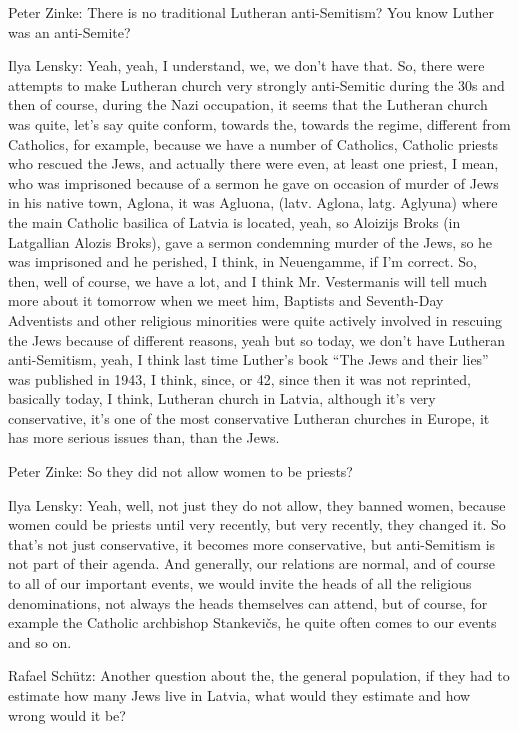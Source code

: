 Peter Zinke: There is no traditional Lutheran anti-Semitism? You know Luther was an anti-Semite? 

Ilya Lensky: Yeah, yeah, I understand, we, we don’t have that. So, there were attempts to make Lutheran church very strongly anti-Semitic during the 30s and then of course, during the Nazi occupation, it seems that the Lutheran church was quite, let’s say quite conform, towards the, towards the regime, different from Catholics, for example, because we have a number of Catholics, Catholic priests who rescued the Jews, and actually there were even, at least one priest, I mean, who was imprisoned because of a sermon he gave on occasion of murder of Jews in his native town, Aglona, it was Agluona, (latv. Aglona, latg. Aglyuna) where the main Catholic basilica of Latvia is located, yeah, so Aloizijs Broks (in Latgallian Alozis Broks), gave a sermon condemning murder of the Jews, so he was imprisoned and he perished, I think, in Neuengamme, if I’m correct. So, then, well of course, we have a lot, and I think Mr. Vestermanis will tell much more about it tomorrow when we meet him, Baptists and Seventh-Day Adventists and other religious minorities were quite actively involved in rescuing the Jews because of different reasons, yeah but so today, we don’t have Lutheran anti-Semitism, yeah, I think last time Luther’s book “The Jews and their lies” was published in 1943, I think, since, or 42, since then it was not reprinted, basically today, I think, Lutheran church in Latvia, although it’s very conservative, it’s one of the most conservative Lutheran churches in Europe, it has more serious issues than, than the Jews.

Peter Zinke: So they did not allow women to be priests? 

Ilya Lensky: Yeah, well, not just they do not allow, they banned women, because women could be priests until very recently, but very recently, they changed it. So that’s not just conservative, it becomes more conservative, but anti-Semitism is not part of their agenda. And generally, our relations are normal, and of course to all of our important events, we would invite the heads of all the religious denominations, not always the heads themselves can attend, but of course, for example the Catholic archbishop Stankevičs, he quite often comes to our events and so on. 

Rafael Schütz: Another question about the, the general population, if they had to estimate how many Jews live in Latvia, what would they estimate and how wrong would it be? 

